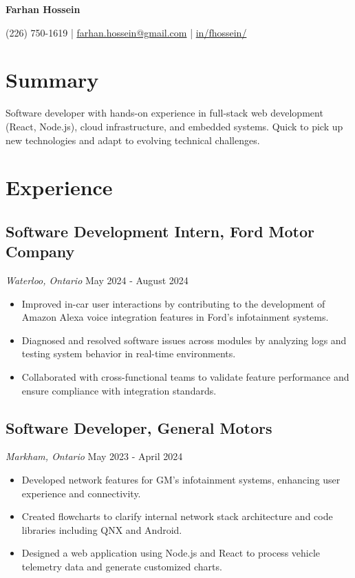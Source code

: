 \documentclass[a4paper,11pt]{article}  %
\begin{document}
\begin{center}
    {\Huge\textbf{Farhan Hossein}}
\end{center}
\vspace{-4mm}

\begin{center}
    \small{
    (226) 750-1619 | \href{mailto:farhan.hossein@gmail.com}{farhan.hossein@gmail.com} | 
    \href{https://linkedin.com/in/fhossein}{in/fhossein/}
    }
\end{center}
\vspace{-6mm}

\section{Summary}
\noindent Software developer with hands-on experience in full-stack web development (React, Node.js), cloud infrastructure, and embedded systems. Quick to pick up new technologies and adapt to evolving technical challenges.

\section{Experience}

\subsection*{Software Development Intern, Ford Motor Company}
\textit{Waterloo, Ontario} \hfill May 2024 - August 2024
\begin{itemize}
    \item Improved in-car user interactions by contributing to the development of Amazon Alexa voice integration features in Ford’s infotainment systems.
    \item Diagnosed and resolved software issues across modules by analyzing logs and testing system behavior in real-time environments.
    \item Collaborated with cross-functional teams to validate feature performance and ensure compliance with integration standards.
\end{itemize}


\subsection*{Software Developer, General Motors}
\textit{Markham, Ontario} \hfill May 2023 - April 2024
\begin{itemize}
    \item Developed network features for GM’s infotainment systems, enhancing user experience and connectivity.
    \item Created flowcharts to clarify internal network stack architecture and code libraries including QNX and Android.
    \item Designed a web application using Node.js and React to process vehicle telemetry data and generate customized charts.
\end{itemize}
\end{document}
